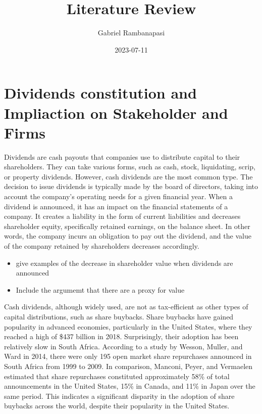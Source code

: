 \documentclass[
]{article}
\title{Literature Review}
\author{Gabriel Rambanapasi}
\date{2023-07-11}
\providecommand{\tightlist}{%
  \setlength{\itemsep}{0pt}\setlength{\parskip}{0pt}}
\begin{document}
\maketitle

\hypertarget{dividends-constitution-and-impliaction-on-stakeholder-and-firms}{%
\section{Dividends constitution and Impliaction on Stakeholder and
Firms}\label{dividends-constitution-and-impliaction-on-stakeholder-and-firms}}

Dividends are cash payouts that companies use to distribute capital to
their shareholders. They can take various forms, such as cash, stock,
liquidating, scrip, or property dividends. However, cash dividends are
the most common type. The decision to issue dividends is typically made
by the board of directors, taking into account the company's operating
needs for a given financial year. When a dividend is announced, it has
an impact on the financial statements of a company. It creates a
liability in the form of current liabilities and decreases shareholder
equity, specifically retained earnings, on the balance sheet. In other
words, the company incurs an obligation to pay out the dividend, and the
value of the company retained by shareholders decreases accordingly.

\begin{itemize}
\tightlist
\item
  give examples of the decrease in shareholder value when dividends are
  announced
\item
  Include the argumemt that there are a proxy for value
\end{itemize}

Cash dividends, although widely used, are not as tax-efficient as other
types of capital distributions, such as share buybacks. Share buybacks
have gained popularity in advanced economies, particularly in the United
States, where they reached a high of \$437 billion in 2018.
Surprisingly, their adoption has been relatively slow in South Africa.
According to a study by Wesson, Muller, and Ward in 2014, there were
only 195 open market share repurchases announced in South Africa from
1999 to 2009. In comparison, Manconi, Peyer, and Vermaelen estimated
that share repurchases constituted approximately 58\% of total
announcements in the United States, 15\% in Canada, and 11\% in Japan
over the same period. This indicates a significant disparity in the
adoption of share buybacks across the world, despite their popularity in
the United States.
\end{document}
